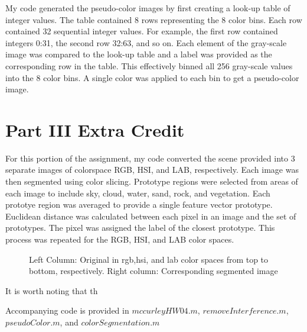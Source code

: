 \documentclass{article}[12 pt]
\begin{document}
\begin{enumerate}
My code generated the pseudo-color images by first creating a look-up table of  integer values.  The table contained 8 rows  representing the 8 color bins.  Each row contained 32 sequential integer values.  For example, the first row contained integers 0:31, the second row 32:63, and so on.  Each element of the gray-scale image was compared to the look-up table and a label was provided as the corresponding row in the table.   This effectively binned all 256 gray-scale values into the 8 color bins.  A single color was applied to each bin to get a pseudo-color image.
\end{enumerate}

\section*{Part III Extra Credit}
For this portion of the assignment, my code converted the scene provided into  3 separate images of colorspace RGB, HSI, and LAB, respectively. Each image was then segmented using color slicing.  Prototype regions were selected from areas of each image to include sky, cloud, water, sand, rock, and vegetation.  Each prototye region was averaged to provide a single feature vector prototype.  Euclidean distance was calculated between each pixel in an image and the set of prototypes.  The pixel was assigned the label of the closest prototype.  This process was repeated for the RGB, HSI, and LAB color spaces.

\begin{figure}[H]
\captionsetup[subfloat]{labelformat=empty}
\centering
{}
\hspace{0mm}
\hspace{0mm}
\caption{Left Column: Original in rgb,hsi, and lab color spaces from top to bottom, respectively.  Right column: Corresponding segmented image}
\label{pc}
\end{figure}

It is worth noting that th

 \noindent 
 Accompanying code is provided in $mccurleyHW04.m$, $removeInterference.m$, $pseudoColor.m$, and $colorSegmentation.m$
\end{document}
